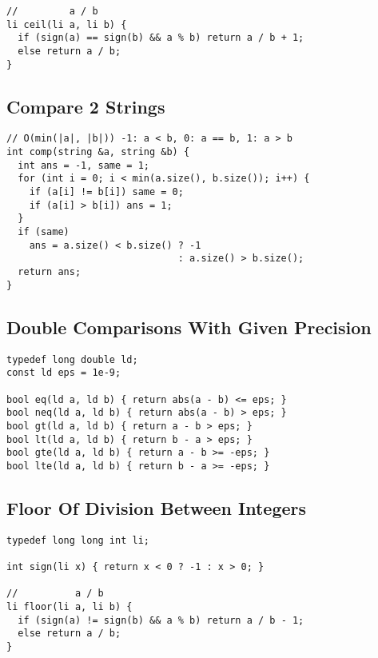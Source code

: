 \documentclass[twoside]{article}
\begin{document}
\begin{multicols*}{2}
\begin{verbatim}
//         a / b
li ceil(li a, li b) {
  if (sign(a) == sign(b) && a % b) return a / b + 1;
  else return a / b;
}
\end{verbatim}

\subsectionfont{\large\bfseries\sffamily\underline}
\subsection*{Compare 2 Strings}
\begin{verbatim}
// O(min(|a|, |b|)) -1: a < b, 0: a == b, 1: a > b
int comp(string &a, string &b) {
  int ans = -1, same = 1;
  for (int i = 0; i < min(a.size(), b.size()); i++) {
    if (a[i] != b[i]) same = 0;
    if (a[i] > b[i]) ans = 1;
  }
  if (same)
    ans = a.size() < b.size() ? -1
                              : a.size() > b.size();
  return ans;
}
\end{verbatim}

\subsectionfont{\large\bfseries\sffamily\underline}
\subsection*{Double Comparisons With Given Precision}
\begin{verbatim}
typedef long double ld;
const ld eps = 1e-9;

bool eq(ld a, ld b) { return abs(a - b) <= eps; }
bool neq(ld a, ld b) { return abs(a - b) > eps; }
bool gt(ld a, ld b) { return a - b > eps; }
bool lt(ld a, ld b) { return b - a > eps; }
bool gte(ld a, ld b) { return a - b >= -eps; }
bool lte(ld a, ld b) { return b - a >= -eps; }
\end{verbatim}

\subsectionfont{\large\bfseries\sffamily\underline}
\subsection*{Floor Of Division Between Integers}
\begin{verbatim}
typedef long long int li;

int sign(li x) { return x < 0 ? -1 : x > 0; }

//          a / b
li floor(li a, li b) {
  if (sign(a) != sign(b) && a % b) return a / b - 1;
  else return a / b;
}
\end{verbatim}


\end{multicols*}
\end{document}
